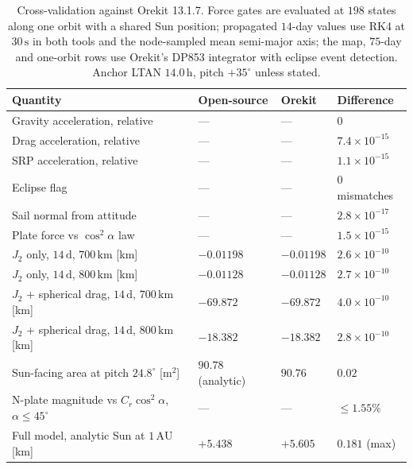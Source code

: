 \begin{table}[htbp]
\centering
\caption{Cross-validation against Orekit 13.1.7. Force gates are evaluated at \(198\) states along one orbit with a shared Sun position; propagated \(14\)-day values use RK4 at \(30\,\mathrm{s}\) in both tools and the node-sampled mean semi-major axis; the map, \(75\)-day and one-orbit rows use Orekit's DP853 integrator with eclipse event detection. Anchor LTAN \(14.0\,\mathrm{h}\), pitch \(+35^\circ\) unless stated.}
\label{tab:orekit}
\vspace{0.5em}
\footnotesize
\setlength{\tabcolsep}{3pt}
\begin{tabular}{>{\raggedright\arraybackslash}p{5.0cm} >{\raggedright\arraybackslash}p{2.4cm} >{\raggedright\arraybackslash}p{2.4cm} >{\raggedright\arraybackslash}p{2.8cm}}
\toprule
Quantity & Open-source & Orekit & Difference \\
\midrule
Gravity acceleration, relative & --- & --- & \(0\) \\
Drag acceleration, relative & --- & --- & \(7.4\times10^{-15}\) \\
SRP acceleration, relative & --- & --- & \(1.1\times10^{-15}\) \\
Eclipse flag & --- & --- & \(0\) mismatches \\
Sail normal from attitude & --- & --- & \(2.8\times10^{-17}\) \\
Plate force vs \(\cos^2\alpha\) law & --- & --- & \(1.5\times10^{-15}\) \\
\(J_2\) only, \(14\,\mathrm{d}\), \(700\,\mathrm{km}\) [km] & \(-0.01198\) & \(-0.01198\) & \(2.6\times10^{-10}\) \\
\(J_2\) only, \(14\,\mathrm{d}\), \(800\,\mathrm{km}\) [km] & \(-0.01128\) & \(-0.01128\) & \(2.7\times10^{-10}\) \\
\(J_2\) + spherical drag, \(14\,\mathrm{d}\), \(700\,\mathrm{km}\) [km] & \(-69.872\) & \(-69.872\) & \(4.0\times10^{-10}\) \\
\(J_2\) + spherical drag, \(14\,\mathrm{d}\), \(800\,\mathrm{km}\) [km] & \(-18.382\) & \(-18.382\) & \(2.8\times10^{-10}\) \\
Sun-facing area at pitch \(24.8^\circ\) [m\(^2\)] & \(90.78\) (analytic) & \(90.76\) & \(0.02\) \\
N-plate magnitude vs \(C_r\cos^2\alpha\), \(\alpha \le 45^\circ\) & --- & --- & \(\le 1.55\%\) \\
Full model, analytic Sun at \(1\,\mathrm{AU}\) [km] & \(+5.438\) & \(+5.605\) & \(0.181\) (max) \\

\end{tabular}
\end{table}
